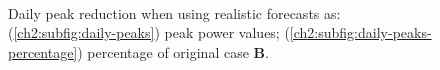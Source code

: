 \begin{figure}\centering
	\\
	\caption{Daily peak reduction when using realistic forecasts as: (\ref{ch2:subfig:daily-peaks}) peak power values; (\ref{ch2:subfig:daily-peaks-percentage}) percentage of original case \textbf{B}.}
	\label{ch2:fig:daily-peaks}
\end{figure}